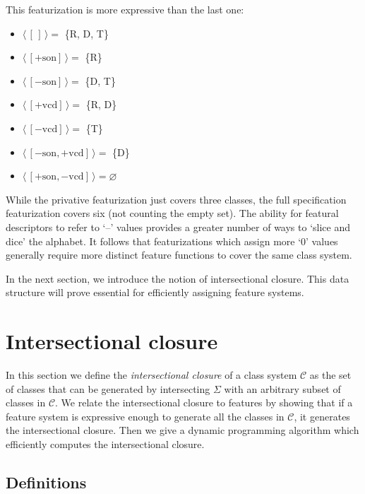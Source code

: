 \documentclass[11pt, oneside]{article}   	%
\begin{document}
\noindent This featurization is more expressive than the last one: \begin{itemize}
    \item $\langle \, [\,] \, \rangle =$ \{R, D, T\}
    \item $\langle \, [+\text{son}] \, \rangle =$ \{R\}
    \item $\langle \, [-\text{son}] \, \rangle =$ \{D, T\}
    \item $\langle \, [+\text{vcd}] \, \rangle =$ \{R, D\}
    \item $\langle \, [-\text{vcd}]  \, \rangle=$ \{T\}
    \item $\langle \, [-\text{son},+\text{vcd}] \, \rangle =$ \{D\}
    \item $\langle \, [+\text{son},-\text{vcd}] \, \rangle = \varnothing$
    \end{itemize}

\vspace{\baselineskip} \noindent While the privative featurization just covers three classes, the full specification featurization covers six (not counting the empty set). The ability for featural descriptors to refer to `--' values provides a greater number of ways to `slice and dice' the alphabet. It follows that featurizations which assign more `$0$' values generally require more distinct feature functions to cover the same class system.

\vspace{\baselineskip} In the next section, we introduce the notion of intersectional closure. This data structure will prove essential for efficiently assigning feature systems.

\FloatBarrier
\section{Intersectional closure}
\label{sec:intersectional}

In this section we define the \textit{intersectional closure} of a class system $\mathcal{C}$ as the set of classes that can be generated by intersecting $\Sigma$ with an arbitrary subset of classes in $\mathcal{C}$. We relate the intersectional closure to features by showing that if a feature system is expressive enough to generate all the classes in $\mathcal{C}$, it generates the intersectional closure. Then we give a dynamic programming algorithm which efficiently computes the intersectional closure. 

\subsection{Definitions}
\end{document}
